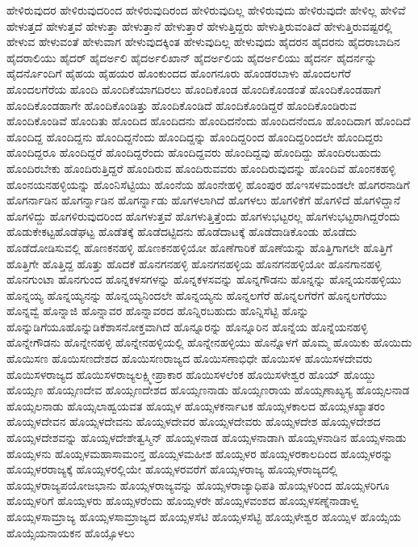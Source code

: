{ಹೇಳಿರುವುದರ
ಹೇಳಿರುವುದರಿಂದ
ಹೇಳಿರುವುದಿರಂದ
ಹೇಳಿರುವುದಿಲ್ಲ
ಹೇಳಿರುವುದು
ಹೇಳಿರುವುದೇ
ಹೇಳಿಲ್ಲ
ಹೇಳಿವೆ
ಹೇಳುತ್ತದೆ
ಹೇಳುತ್ತವೆ
ಹೇಳುತ್ತಾ
ಹೇಳುತ್ತಾನೆ
ಹೇಳುತ್ತಾರೆ
ಹೇಳುತ್ತಿದ್ದರು
ಹೇಳುತ್ತಿರುವಂತಿದೆ
ಹೇಳುತ್ತಿರುವಷ್ಟರಲ್ಲಿ
ಹೇಳುವ
ಹೇಳುವಂತೆ
ಹೇಳುವಾಗ
ಹೇಳುವುದಕ್ಕಿಂತ
ಹೇಳುವುದಿಲ್ಲ
ಹೇಳುವುದು
ಹೈದರನ
ಹೈದರನು
ಹೈದರಾಬಾದಿನ
ಹೈದರಾಲಿಯು
ಹೈದರ್
ಹೈದರ್ಅಲಿ
ಹೈದರ್ಅಲಿಖಾನ್
ಹೈದರ್ಅಲಿಯ
ಹೈದರ್ಅಲಿಯು
ಹೈದರ್ನ
ಹೈದರ್ನನ್ನು
ಹೈದರ್ನೊಂದಿಗೆ
ಹೈಹಯ
ಹೈಹಯರ
ಹೊಂಕುಂದದ
ಹೊಂಗನೂರು
ಹೊಂಡರಬಾಳು
ಹೊಂದಲಗೆರೆ
ಹೊಂದಲಗೆರೆಯ
ಹೊಂದಿ
ಹೊಂದಿಕೆಯಾಗದಿರಲು
ಹೊಂದಿಕೊಂಡ
ಹೊಂದಿಕೊಂಡಂತೆ
ಹೊಂದಿಕೊಂಡಹಾಗೆ
ಹೊಂದಿಕೊಂಡಹಾಗೇ
ಹೊಂದಿಕೊಂಡಿತ್ತು
ಹೊಂದಿಕೊಂಡಿದೆ
ಹೊಂದಿಕೊಂಡಿದ್ದರೆ
ಹೊಂದಿಕೊಂಡಿರುವ
ಹೊಂದಿಕೊಂಡಿವೆ
ಹೊಂದಿತು
ಹೊಂದಿದ
ಹೊಂದಿದನು
ಹೊಂದಿದನೆಂದು
ಹೊಂದಿದನೆಂದೂ
ಹೊಂದಿದಾಗ
ಹೊಂದಿದೆ
ಹೊಂದಿದ್ದ
ಹೊಂದಿದ್ದನು
ಹೊಂದಿದ್ದನೆಂದು
ಹೊಂದಿದ್ದನ್ನು
ಹೊಂದಿದ್ದರಿಂದ
ಹೊಂದಿದ್ದರಿಂದಲೇ
ಹೊಂದಿದ್ದರು
ಹೊಂದಿದ್ದರೂ
ಹೊಂದಿದ್ದರೆ
ಹೊಂದಿದ್ದರೆಂದು
ಹೊಂದಿದ್ದವರು
ಹೊಂದಿದ್ದವು
ಹೊಂದಿದ್ದು
ಹೊಂದಿರಬಹುದು
ಹೊಂದಿರಬೇಕು
ಹೊಂದಿರುತ್ತಿದ್ದರೆ
ಹೊಂದಿರುವ
ಹೊಂದಿರುವವರು
ಹೊಂದಿರುವುದನ್ನು
ಹೊಂದಿವೆ
ಹೊಂನಕಹಳ್ಳಿ
ಹೊಂನಯನಹಳ್ಳಿಯನ್ನು
ಹೊಂನಿಸೆಟ್ಟಿಯು
ಹೊಂನೆಯ
ಹೊಂನೇಹಳ್ಳಿ
ಹೊಂಪುರ
ಹೊಇಸಳಮಂಡಲೇ
ಹೊಗರನಾಡಿಗೆ
ಹೊಗರ್ನಾಡಿನ
ಹೊಗರ್ನ್ನಾಡಿನ
ಹೊಗರ್ನ್ನಾಡು
ಹೊಗಳಲಾಗಿದೆ
ಹೊಗಳಲು
ಹೊಗಳಿಕೆಗೆ
ಹೊಗಳಿದೆ
ಹೊಗಳಿದ್ದಾನೆ
ಹೊಗಳಿದ್ದು
ಹೊಗಳಿರುವುದರಿಂದ
ಹೊಗಳುತ್ತವೆ
ಹೊಗಳುತ್ತಿತ್ತೆಂದು
ಹೊಗಳುಭಟ್ಟರಲ್ಲ
ಹೊಗಳುಭಟ್ಟರಾಗಿದ್ದರೆಂದು
ಹೊಡುಕೇಕಟ್ಟಹೊಡೆಘಟ್ಟ
ಹೊಡೆತಕ್ಕೆ
ಹೊಡೆದಟ್ಟಿದನು
ಹೊಡೆದಾಟಕ್ಕೆ
ಹೊಡೆದಾಡಿಕೊಂಡು
ಹೊಡೆದು
ಹೊಡೆದೋಡಿಸುವಲ್ಲಿ
ಹೊಣಕನಹಳ್ಳಿ
ಹೊಣಕನಹಳ್ಳಿಯೋ
ಹೊಣೆಗಾರಿಕೆ
ಹೊಣೆಯನ್ನು
ಹೊತ್ತಿಗಾಗಲೇ
ಹೊತ್ತಿಗೆ
ಹೊತ್ತಿಗೇ
ಹೊತ್ತಿದ್ದ
ಹೊತ್ತು
ಹೊದಕೆ
ಹೊನಗನಹಳ್ಳಿ
ಹೊನಗನಹಳ್ಳಿಯ
ಹೊನಗನಹಳ್ಳಿಯೋ
ಹೊನಗಾನಹಳ್ಳಿ
ಹೊನಗುಂಟಾ
ಹೊನಗುಂದ
ಹೊನ್ನಕಳಸಗಳನ್ನು
ಹೊನ್ನಕಳಸವನ್ನು
ಹೊನ್ನಗೌಡನು
ಹೊನ್ನನ್ನು
ಹೊನ್ನಯನಹಳ್ಳಿಯು
ಹೊನ್ನಯ್ಯ
ಹೊನ್ನಯ್ಯನನ್ನು
ಹೊನ್ನಯ್ಯನಿಂದಲೇ
ಹೊನ್ನಯ್ಯನು
ಹೊನ್ನಲಗೆರೆ
ಹೊನ್ನಲಗೆರೆಗೆ
ಹೊನ್ನಲಗೆರೆಯು
ಹೊನ್ನವ್ವೆ
ಹೊನ್ನಾಜಿ
ಹೊನ್ನಾವರ
ಹೊನ್ನಾವರದ
ಹೊನ್ನಿರಬಹುದು
ಹೊನ್ನಿಸೆಟ್ಟಿ
ಹೊನ್ನು
ಹೊನ್ನುಡಿಗೆಯೂಹೊನ್ನುಡಿಕೆಶಾಸನೋಕ್ತವಾಗಿದೆ
ಹೊನ್ನೂರನ್ನು
ಹೊನ್ನೂರಿನ
ಹೊನ್ನೆಯ
ಹೊನ್ನೆಯನಹಳ್ಳಿ
ಹೊನ್ನೇಗೌಡನು
ಹೊನ್ನೇನಹಳ್ಳಿ
ಹೊನ್ನೇನಹಳ್ಳಿಯಲ್ಲಿ
ಹೊನ್ನೇನಹಳ್ಳಿಯು
ಹೊನ್ನೊಳಗೆ
ಹೊಮ್ಮ
ಹೊಯಿಕು
ಹೊಯಿದು
ಹೊಯಿಸಣ
ಹೊಯಿಸಣದೇಶದ
ಹೊಯಿಸಣರಾಜ್ಯದ
ಹೊಯಿಸಣಾಭಿಧೇ
ಹೊಯಿಸಳ
ಹೊಯಿಸಳದೇವರು
ಹೊಯಿಸಳರಾಜ್ಯದ
ಹೊಯಿಸಳರಾಜ್ಯಲಕ್ಷ್ಮೀಪ್ರಾಕಾರ
ಹೊಯಿಸಳಲೆಂಕ
ಹೊಯಿಸಳೇಶ್ವರ
ಹೊಯ್
ಹೊಯ್ದು
ಹೊಯ್ಸಣ
ಹೊಯ್ಸಣದೇವ
ಹೊಯ್ಸಣದೇಶದ
ಹೊಯ್ಸಣನಾಡು
ಹೊಯ್ಸಣರಾಯ
ಹೊಯ್ಸಣಾಖ್ಯಸ್ಯ
ಹೊಯ್ಸಲನಾಡ
ಹೊಯ್ಸಲನಾಡು
ಹೊಯ್ಸಲಾಹ್ವಯವತ
ಹೊಯ್ಸಳ
ಹೊಯ್ಸಳಕರ್ನಾಟಕ
ಹೊಯ್ಸಳಕಾಲದ
ಹೊಯ್ಸಳಖ್ಯಾತರಂ
ಹೊಯ್ಸಳದೇವನ
ಹೊಯ್ಸಳದೇವನು
ಹೊಯ್ಸಳದೇವರ
ಹೊಯ್ಸಳದೇವರು
ಹೊಯ್ಸಳದೇಶ
ಹೊಯ್ಸಳದೇಶದ
ಹೊಯ್ಸಳದೇಶವನ್ನು
ಹೊಯ್ಸಳದೇಶೇತ್ವಸ್ಮಿನ್
ಹೊಯ್ಸಳನಾಡ
ಹೊಯ್ಸಳನಾಡಾಗಿ
ಹೊಯ್ಸಳನಾಡಿನ
ಹೊಯ್ಸಳನಾಡು
ಹೊಯ್ಸಳನು
ಹೊಯ್ಸಳಮಹಾಸಾಮಂನ್ತ
ಹೊಯ್ಸಳಮಹೀಶ
ಹೊಯ್ಸಳರ
ಹೊಯ್ಸಳರಕಾಲದಿಂದ
ಹೊಯ್ಸಳರನ್ನು
ಹೊಯ್ಸಳರರಾಜ್ಯಕ್ಕೆ
ಹೊಯ್ಸಳರಲ್ಲಿಯೇ
ಹೊಯ್ಸಳರವರೆಗೆ
ಹೊಯ್ಸಳರಾಜ್ಯ
ಹೊಯ್ಸಳರಾಜ್ಯದಲ್ಲಿ
ಹೊಯ್ಸಳರಾಜ್ಯಪಯೋಜಭಾನು
ಹೊಯ್ಸಳರಾಜ್ಯವನ್ನು
ಹೊಯ್ಸಳರಾಜ್ಯಾಧಿಪತಿ
ಹೊಯ್ಸಳರಿಂದ
ಹೊಯ್ಸಳರಿಗೂ
ಹೊಯ್ಸಳರಿಗೆ
ಹೊಯ್ಸಳರು
ಹೊಯ್ಸಳರೆಂದು
ಹೊಯ್ಸಳರೇ
ಹೊಯ್ಸಳವಂಶದ
ಹೊಯ್ಸಳಸಣ್ನೆನಾಡಾಳ್ವ
ಹೊಯ್ಸಳಸಾಮ್ರಾಜ್ಯ
ಹೊಯ್ಸಳಸಾಮ್ರಾಜ್ಯದ
ಹೊಯ್ಸಳಸೆಟಿ
ಹೊಯ್ಸಳಸೆಟ್ಟಿ
ಹೊಯ್ಸಳೇಶ್ವರ
ಹೊಯ್ಸಿಳ
ಹೊಯ್ಸೆಯ
ಹೊಯ್ಸೆಯನಾಯಕನ
ಹೊಯ್ಸೊಳಲು
}
